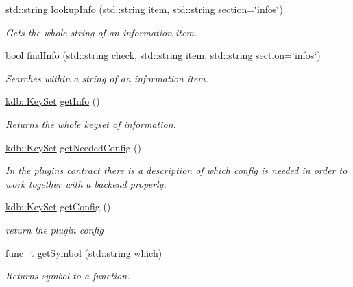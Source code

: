 \begin{DoxyCompactItemize}
std\+::string \mbox{\hyperlink{classkdb_1_1tools_1_1Plugin_a5f1dc42adda8340f330eb902812e667d}{lookup\+Info}} (std\+::string item, std\+::string section=\char`\"{}infos\char`\"{})
\begin{DoxyCompactList}\small\item\em Gets the whole string of an information item. \end{DoxyCompactList}\item 
bool \mbox{\hyperlink{classkdb_1_1tools_1_1Plugin_a7911f8c46aea6fe4ec6fcb4788b77beb}{find\+Info}} (std\+::string \mbox{\hyperlink{classkdb_1_1tools_1_1Plugin_a5bb3db65b9d87d18787da8cc65eaca65}{check}}, std\+::string item, std\+::string section=\char`\"{}infos\char`\"{})
\begin{DoxyCompactList}\small\item\em Searches within a string of an information item. \end{DoxyCompactList}\item 
\mbox{\hyperlink{classkdb_1_1KeySet}{kdb\+::\+Key\+Set}} \mbox{\hyperlink{classkdb_1_1tools_1_1Plugin_aa4eac3b2b515104a0d595c717c546ec0}{get\+Info}} ()
\begin{DoxyCompactList}\small\item\em Returns the whole keyset of information. \end{DoxyCompactList}\item 
\mbox{\hyperlink{classkdb_1_1KeySet}{kdb\+::\+Key\+Set}} \mbox{\hyperlink{classkdb_1_1tools_1_1Plugin_ad2a0a4a64d17c479e7cd8b1402275cc7}{get\+Needed\+Config}} ()
\begin{DoxyCompactList}\small\item\em In the plugin\textquotesingle{}s contract there is a description of which config is needed in order to work together with a backend properly. \end{DoxyCompactList}\item 
\mbox{\hyperlink{classkdb_1_1KeySet}{kdb\+::\+Key\+Set}} \mbox{\hyperlink{classkdb_1_1tools_1_1Plugin_af3004444f5ef05dc8106646ff2b95694}{get\+Config}} ()
\begin{DoxyCompactList}\small\item\em return the plugin config \end{DoxyCompactList}\item 
func\+\_\+t \mbox{\hyperlink{classkdb_1_1tools_1_1Plugin_aca31140802ab463d5bddd95dee73194d}{get\+Symbol}} (std\+::string which)
\begin{DoxyCompactList}\small\item\em Returns symbol to a function. \end{DoxyCompactList}\item 

\end{DoxyCompactItemize}
